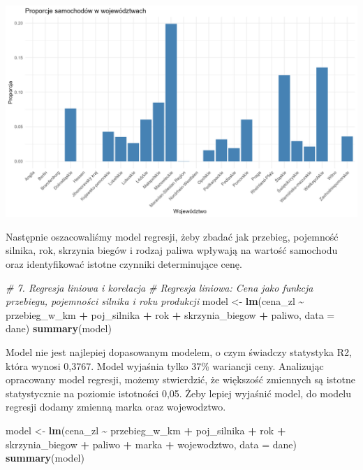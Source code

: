 \documentclass[
]{article}
\newenvironment{Shaded}{\begin{snugshade}}{\end{snugshade}}
\newcommand{\AttributeTok}[1]{\textcolor[rgb]{0.13,0.29,0.53}{#1}}
\newcommand{\CommentTok}[1]{\textcolor[rgb]{0.56,0.35,0.01}{\textit{#1}}}
\newcommand{\FunctionTok}[1]{\textcolor[rgb]{0.13,0.29,0.53}{\textbf{#1}}}
\newcommand{\NormalTok}[1]{#1}
\newcommand{\OtherTok}[1]{\textcolor[rgb]{0.56,0.35,0.01}{#1}}
\newcommand{\SpecialCharTok}[1]{\textcolor[rgb]{0.81,0.36,0.00}{\textbf{#1}}}
\begin{document}
\includegraphics[width=1\linewidth]{analiza/wykres_proporcje}

Następnie oszacowaliśmy model regresji, żeby zbadać jak przebieg,
pojemność silnika, rok, skrzynia biegów i rodzaj paliwa wpływają na
wartość samochodu oraz identyfikować istotne czynniki determinujące
cenę.

\begin{Shaded}
\begin{Highlighting}[]
\CommentTok{\# 7. Regresja liniowa i korelacja}
\CommentTok{\# Regresja liniowa: Cena jako funkcja przebiegu, pojemności silnika i roku produkcji}
\NormalTok{model }\OtherTok{\textless{}{-}} \FunctionTok{lm}\NormalTok{(cena\_zl }\SpecialCharTok{\textasciitilde{}}\NormalTok{ przebieg\_w\_km }\SpecialCharTok{+}\NormalTok{ poj\_silnika }\SpecialCharTok{+}\NormalTok{ rok }\SpecialCharTok{+}\NormalTok{ skrzynia\_biegow}
            \SpecialCharTok{+}\NormalTok{ paliwo, }\AttributeTok{data =}\NormalTok{ dane)}
\FunctionTok{summary}\NormalTok{(model)}
\end{Highlighting}
\end{Shaded}

Model nie jest najlepiej dopasowanym modelem, o czym świadczy statystyka
R2, która wynosi 0,3767. Model wyjaśnia tylko 37\% wariancji ceny.
Analizując opracowany model regresji, możemy stwierdzić, że większość
zmiennych są istotne statystycznie na poziomie istotności 0,05. Żeby
lepiej wyjaśnić model, do modelu regresji dodamy zmienną marka oraz
wojewodztwo.

\begin{Shaded}
\begin{Highlighting}[]
\NormalTok{model }\OtherTok{\textless{}{-}} \FunctionTok{lm}\NormalTok{(cena\_zl }\SpecialCharTok{\textasciitilde{}}\NormalTok{ przebieg\_w\_km }\SpecialCharTok{+}\NormalTok{ poj\_silnika }\SpecialCharTok{+}\NormalTok{ rok }\SpecialCharTok{+}\NormalTok{ skrzynia\_biegow}
            \SpecialCharTok{+}\NormalTok{ paliwo }\SpecialCharTok{+}\NormalTok{ marka }\SpecialCharTok{+}\NormalTok{ wojewodztwo, }\AttributeTok{data =}\NormalTok{ dane)}
\FunctionTok{summary}\NormalTok{(model)}
\end{Highlighting}
\end{Shaded}
\end{document}
